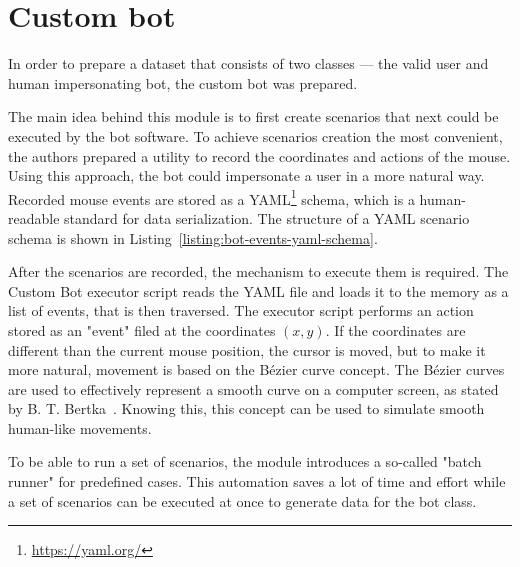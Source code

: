 \section{Custom bot}\label{sec:custom-bot}
In order to prepare a dataset that consists of two classes --- the valid user and human impersonating bot, the custom bot was prepared.

The main idea behind this module is to first create scenarios that next could be executed by the bot software.
To achieve scenarios creation the most convenient, the authors prepared a utility to record the coordinates and actions of the mouse.
Using this approach, the bot could impersonate a user in a more natural way.
Recorded mouse events are stored as a YAML\footnote{\url{https://yaml.org/}} schema, which is a human-readable standard for data serialization.
The structure of a YAML scenario schema is shown in Listing~\ref{listing:bot-events-yaml-schema}.



After the scenarios are recorded, the mechanism to execute them is required.
The Custom Bot executor script reads the YAML file and loads it to the memory as a list of events, that is then traversed.
The executor script performs an action stored as an "event" filed at the coordinates $(x, y)$.
If the coordinates are different than the current mouse position, the cursor is moved, but to make it more natural, movement is based on the Bézier curve concept.
The Bézier curves are used to effectively represent a smooth curve on a computer screen, as stated by B. T. Bertka~\cite{bezier-curves}. Knowing this, this concept can be used to simulate smooth human-like movements.

To be able to run a set of scenarios, the module introduces a so-called "batch runner" for predefined cases.
This automation saves a lot of time and effort while a set of scenarios can be executed at once to generate data for the bot class.

